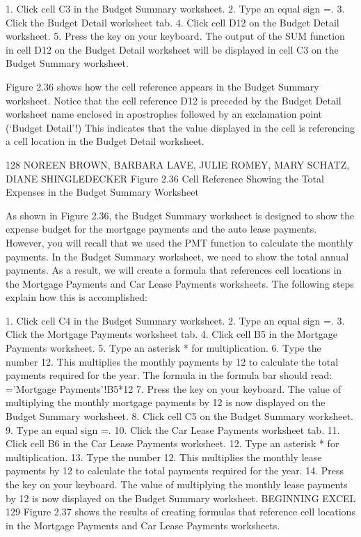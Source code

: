 1.   Click cell C3 in the Budget Summary worksheet.
2.   Type an equal sign =.
3.   Click the Budget Detail worksheet tab.
4.   Click cell D12 on the Budget Detail worksheet.
5.   Press the  key on your keyboard. The output of the SUM function in cell D12 on
the Budget Detail worksheet will be displayed in cell C3 on the Budget Summary worksheet.

Figure 2.36 shows how the cell reference appears in the Budget Summary worksheet. Notice that
the cell reference D12 is preceded by the Budget Detail worksheet name enclosed in apostrophes
followed by an exclamation point (‘Budget Detail’!) This indicates that the value displayed in the cell
is referencing a cell location in the Budget Detail worksheet.




128 NOREEN BROWN, BARBARA LAVE, JULIE ROMEY, MARY SCHATZ, DIANE SHINGLEDECKER
Figure 2.36 Cell Reference Showing the Total Expenses in the Budget Summary Worksheet


As shown in Figure 2.36, the Budget Summary worksheet is designed to show the expense budget
for the mortgage payments and the auto lease payments. However, you will recall that we used the
PMT function to calculate the monthly payments. In the Budget Summary worksheet, we need to
show the total annual payments. As a result, we will create a formula that references cell locations in
the Mortgage Payments and Car Lease Payments worksheets. The following steps explain how this
is accomplished:

1.   Click cell C4 in the Budget Summary worksheet.
2.   Type an equal sign =.
3.   Click the Mortgage Payments worksheet tab.
4.   Click cell B5 in the Mortgage Payments worksheet.
5.   Type an asterisk * for multiplication.
6.   Type the number 12. This multiplies the monthly payments by 12 to calculate the total payments
required for the year. The formula in the formula bar should read: =’Mortgage Payments’!B5*12
7.   Press the  key on your keyboard. The value of multiplying the monthly mortgage
payments by 12 is now displayed on the Budget Summary worksheet.
8.   Click cell C5 on the Budget Summary worksheet.
9.   Type an equal sign =.
10.   Click the Car Lease Payments worksheet tab.
11.   Click cell B6 in the Car Lease Payments worksheet.
12.   Type an asterisk * for multiplication.
13.   Type the number 12. This multiplies the monthly lease payments by 12 to calculate the total
payments required for the year.
14.   Press the  key on your keyboard. The value of multiplying the monthly lease payments
by 12 is now displayed on the Budget Summary worksheet.
BEGINNING EXCEL 129
Figure 2.37 shows the results of creating formulas that reference cell locations in the Mortgage
Payments and Car Lease Payments worksheets.




